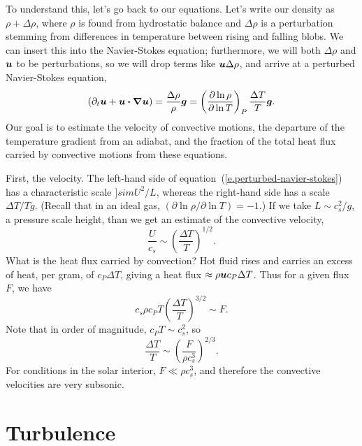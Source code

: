 To understand this, let's go back to our equations.  Let's write our density as $\rho + \Delta\rho$, where $\rho$ is found from hydrostatic balance and $\Delta\rho$ is a perturbation stemming from differences in temperature between rising and falling blobs.   We can insert this into the Navier-Stokes equation; furthermore, we will both $\Delta\rho$ and $\boldsymbol{u}$ to be perturbations, so we will drop terms like $\boldsymbol{u}\Delta \rho$, and arrive at a perturbed Navier-Stokes equation,
\begin{equation}\label{e.perturbed-navier-stokes}
 (\partial_{t}\boldsymbol{u} + \boldsymbol{u}\boldsymbol{\cdot}\boldsymbol{\nabla}\boldsymbol{u}) = \frac{\Delta\rho}{\rho}\boldsymbol{g} = \left(\frac{\partial\ln\rho}{\partial\ln T}\right)_{P}\frac{\Delta T}{T}\boldsymbol{g}.
 \end{equation}
Our goal is to estimate the velocity of convective motions, the departure of the temperature gradient from an adiabat, and the fraction of the total heat flux carried by convective motions from these equations.

First, the velocity.  The left-hand side of equation~(\ref{e.perturbed-navier-stokes}) has a characteristic scale $]sim U^{2}/L$, whereas the right-hand side has a scale $\Delta T/T g$. (Recall that in an ideal gas, $(\partial\ln \rho/\partial\ln T) = -1$.)  If we take $L \sim c_{s}^{2}/g$, a pressure scale height, than we get an estimate of the convective velocity,
\begin{equation}\label{e.convective-velocity-estimate}
\frac{U}{c_{s}} \sim \left(\frac{\Delta T}{T}\right)^{1/2}.
\end{equation}
What is the heat flux carried by convection? Hot fluid rises and carries an excess of heat, per gram, of $c_{P}\Delta T$, giving a heat flux $\approx \rho \boldsymbol{u} c_{P}\Delta T$. Thus for a given flux $F$, we have
\[
c_{s}\rho c_{P} T\left(\frac{\Delta T}{T}\right)^{3/2} \sim F.
\]
Note that in order of magnitude, $c_{P}T \sim c_{s}^{2}$, so 
\[
\frac{\Delta T}{T} \sim \left(\frac{F}{\rho c_{s}^{3}}\right)^{2/3}.
\]
For conditions in the solar interior, $F \ll \rho c_{s}^{3}$, and therefore the convective velocities are very subsonic. 

\section{Turbulence}
 
